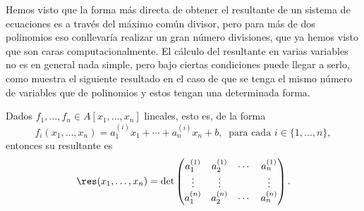 Hemos visto que la forma más directa de obtener el resultante de un sistema de ecuaciones es a través del máximo común divisor, pero para más de dos polinomios eso conllevaría realizar un gran número divisiones, que ya hemos visto que son caras computacionalmente. El cálculo del resultante en varias variables no es en general nada simple, pero bajo ciertas condiciones puede llegar a serlo, como muestra el siguiente resultado en el caso de que se tenga el mismo número de variables que de polinomios y estos tengan una determinada forma.
\begin{teorema}\label{t:elimRes}
    Dados $f_1,\dots, f_n \in A[x_1,\dots, x_n]$ lineales, esto es, de la forma 
    $$f_i(x_1,\dots, x_n) = a_1^{(i)}x_1 + \cdots + a_n^{(i)}x_n + b,\ \text{ para cada } i\in \{1,\dots, n\},$$
    entonces su resultante es
    $$\res(x_1,\dots, x_n) = \det\begin{pmatrix}
        a_1^{(1)} & a_2^{(1)} & \cdots & a_n^{(1)} \\
        \vdots    & \vdots & &\vdots\\
        a_1^{(n)} & a_2^{(n)} & \cdots & a_n^{(n)}
    \end{pmatrix}.$$
\end{teorema}

